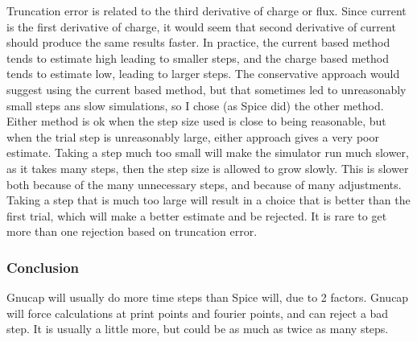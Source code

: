 Truncation error is related to the third derivative of charge or flux.
Since current is the first derivative of charge, it would seem that
second derivative of current should produce the same results faster.
In practice, the current based method tends to estimate high leading
to smaller steps, and the charge based method tends to estimate low,
leading to larger steps.  The conservative approach would suggest
using the current based method, but that sometimes led to unreasonably
small steps ans slow simulations, so I chose (as Spice did) the other
method.  Either method is ok when the step size used is close to being
reasonable, but when the trial step is unreasonably large, either
approach gives a very poor estimate.  Taking a step much too small
will make the simulator run much slower, as it takes many steps, then
the step size is allowed to grow slowly.  This is slower both because
of the many unnecessary steps, and because of many adjustments.
Taking a step that is much too large will result in a choice that is
better than the first trial, which will make a better estimate and be
rejected.  It is rare to get more than one rejection based on
truncation error.

\subsubsection{Conclusion}

Gnucap will usually do more time steps than Spice will, due to 2 factors.
Gnucap will force calculations at print points and fourier points, and
can reject a bad step.  It is usually a little more, but could be as
much as twice as many steps.

